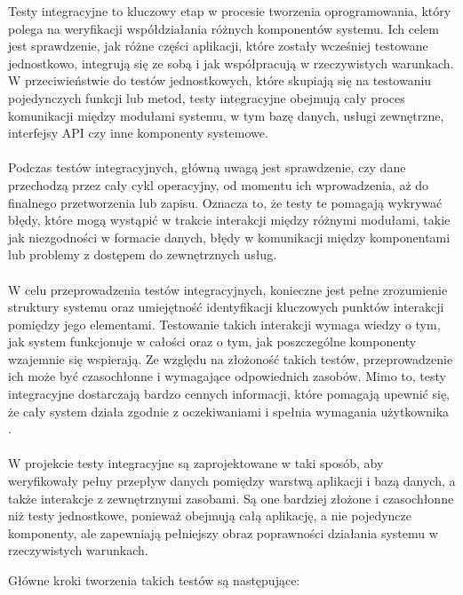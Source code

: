 \documentclass[twoside]{projektInzynierskiMS1}
\begin{document}
\noindent
Testy integracyjne to kluczowy etap w procesie tworzenia oprogramowania, który polega na weryfikacji współdziałania różnych komponentów systemu. Ich celem jest sprawdzenie, jak różne części aplikacji, które zostały wcześniej testowane jednostkowo, integrują się ze sobą i jak współpracują w rzeczywistych warunkach. W przeciwieństwie do testów jednostkowych, które skupiają się na testowaniu pojedynczych funkcji lub metod, testy integracyjne obejmują cały proces komunikacji między modułami systemu, w tym bazę danych, usługi zewnętrzne, interfejsy API czy inne komponenty systemowe.
\\\\
Podczas testów integracyjnych, główną uwagą jest sprawdzenie, czy dane przechodzą przez cały cykl operacyjny, od momentu ich wprowadzenia, aż do finalnego przetworzenia lub zapisu. Oznacza to, że testy te pomagają wykrywać błędy, które mogą wystąpić w trakcie interakcji między różnymi modułami, takie jak niezgodności w formacie danych, błędy w komunikacji między komponentami lub problemy z dostępem do zewnętrznych usług. 
\\\\
W celu przeprowadzenia testów integracyjnych, konieczne jest pełne zrozumienie struktury systemu oraz umiejętność identyfikacji kluczowych punktów interakcji pomiędzy jego elementami. Testowanie takich interakcji wymaga wiedzy o tym, jak system funkcjonuje w całości oraz o tym, jak poszczególne komponenty wzajemnie się wspierają. Ze względu na złożoność takich testów, przeprowadzenie ich może być czasochłonne i wymagające odpowiednich zasobów. Mimo to, testy integracyjne dostarczają bardzo cennych informacji, które pomagają upewnić się, że cały system działa zgodnie z oczekiwaniami i spełnia wymagania użytkownika \cite{TestyIntegracyjne}.
\\\\
W projekcie testy integracyjne są zaprojektowane w taki sposób, aby weryfikowały pełny przepływ danych pomiędzy warstwą aplikacji i bazą danych, a także interakcje z zewnętrznymi zasobami. Są one bardziej złożone i czasochłonne niż testy jednostkowe, ponieważ obejmują całą aplikację, a nie pojedyncze komponenty, ale zapewniają pełniejszy obraz poprawności działania systemu w rzeczywistych warunkach. 

\newpage

\noindent
Główne kroki tworzenia takich testów są następujące:
\end{document}
